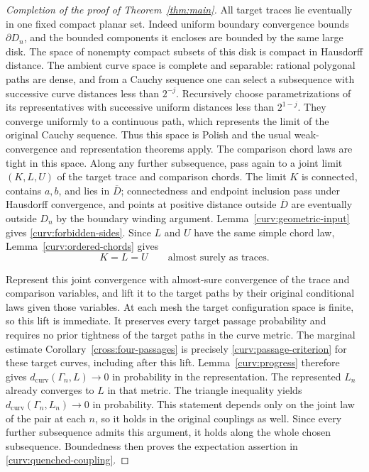 \begin{proof}[Completion of the proof of Theorem~\ref{thm:main}]
All target traces lie eventually in one fixed compact planar set.
Indeed uniform boundary convergence bounds $\partial D_n$, and the
bounded components it encloses are bounded by the same large disk.
The space of nonempty compact subsets of this disk is compact in
Hausdorff distance.  The ambient curve space is complete and separable:
rational polygonal paths are dense, and from a Cauchy sequence one can
select a subsequence with successive curve distances less than $2^{-j}$.
Recursively choose parametrizations of its representatives with
successive uniform distances less than $2^{1-j}$.  They converge
uniformly to a continuous path, which represents the limit of the
original Cauchy sequence.  Thus this space is Polish and the usual
weak-convergence and representation theorems apply.  The comparison
chord laws are tight in this space.  Along any further subsequence,
pass again to a joint
limit $(K,L,U)$ of the target trace and comparison chords.  The limit
$K$ is connected, contains $a,b$, and lies in $\overline D$;
connectedness and endpoint inclusion pass under Hausdorff convergence,
and points at positive distance outside $\overline D$ are eventually
outside $D_n$ by the boundary winding argument.  Lemma~\ref{curv:geometric-input}
gives \eqref{curv:forbidden-sides}.  Since $L$ and $U$ have the same
simple chord law, Lemma~\ref{curv:ordered-chords} gives
\[
 K=L=U\qquad\text{almost surely as traces}.
\]

Represent this joint convergence with almost-sure convergence of the
trace and comparison variables, and lift it to the target paths by
their original conditional laws given those variables.  At each mesh the target
configuration space is finite, so this lift is immediate.  It preserves
every target passage probability and requires no prior tightness of
the target paths in the curve metric.  The marginal estimate
Corollary~\ref{cross:four-passages} is precisely
\eqref{curv:passage-criterion} for these target curves, including after
this lift.  Lemma~\ref{curv:progress} therefore gives
$d_{\mathrm{curv}}(\Gamma_n,L)\to0$ in probability in the
representation.  The represented $L_n$ already converges to $L$ in
that metric.  The triangle inequality yields
$d_{\mathrm{curv}}(\Gamma_n,L_n)\to0$ in probability.  This statement
depends only on the joint law of the pair at each $n$, so it holds in
the original couplings as well.  Since every further subsequence
admits this argument, it holds along the whole chosen subsequence.
Boundedness then proves the expectation assertion in
\eqref{curv:quenched-coupling}.


\end{proof}
